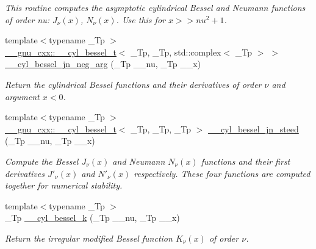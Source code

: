 \begin{DoxyCompactItemize}
\begin{DoxyCompactList}\small\item\em This routine computes the asymptotic cylindrical Bessel and Neumann functions of order nu\+: $ J_{\nu}(x) $, $ N_{\nu}(x) $. Use this for $ x >> nu^2 + 1 $. \end{DoxyCompactList}\item 
{\footnotesize template$<$typename \+\_\+\+Tp $>$ }\\\hyperlink{struct____gnu__cxx_1_1____cyl__bessel__t}{\+\_\+\+\_\+gnu\+\_\+cxx\+::\+\_\+\+\_\+cyl\+\_\+bessel\+\_\+t}$<$ \+\_\+\+Tp, \+\_\+\+Tp, std\+::complex$<$ \+\_\+\+Tp $>$ $>$ \hyperlink{namespacestd_1_1____detail_a82d890270a5a8697d4af64c390b4b0e4}{\+\_\+\+\_\+cyl\+\_\+bessel\+\_\+jn\+\_\+neg\+\_\+arg} (\+\_\+\+Tp \+\_\+\+\_\+nu, \+\_\+\+Tp \+\_\+\+\_\+x)
\begin{DoxyCompactList}\small\item\em Return the cylindrical Bessel functions and their derivatives of order $ \nu $ and argument $ x < 0 $. \end{DoxyCompactList}\item 
{\footnotesize template$<$typename \+\_\+\+Tp $>$ }\\\hyperlink{struct____gnu__cxx_1_1____cyl__bessel__t}{\+\_\+\+\_\+gnu\+\_\+cxx\+::\+\_\+\+\_\+cyl\+\_\+bessel\+\_\+t}$<$ \+\_\+\+Tp, \+\_\+\+Tp, \+\_\+\+Tp $>$ \hyperlink{namespacestd_1_1____detail_a92e231f659735cf87c67a35f5ac4dd36}{\+\_\+\+\_\+cyl\+\_\+bessel\+\_\+jn\+\_\+steed} (\+\_\+\+Tp \+\_\+\+\_\+nu, \+\_\+\+Tp \+\_\+\+\_\+x)
\begin{DoxyCompactList}\small\item\em Compute the Bessel $ J_\nu(x) $ and Neumann $ N_\nu(x) $ functions and their first derivatives $ J'_\nu(x) $ and $ N'_\nu(x) $ respectively. These four functions are computed together for numerical stability. \end{DoxyCompactList}\item 
{\footnotesize template$<$typename \+\_\+\+Tp $>$ }\\\+\_\+\+Tp \hyperlink{namespacestd_1_1____detail_ac9152f2369a18aa795fe24ccfa6dcf12}{\+\_\+\+\_\+cyl\+\_\+bessel\+\_\+k} (\+\_\+\+Tp \+\_\+\+\_\+nu, \+\_\+\+Tp \+\_\+\+\_\+x)
\begin{DoxyCompactList}\small\item\em Return the irregular modified Bessel function $ K_{\nu}(x) $ of order $ \nu $. \end{DoxyCompactList}\item 

\end{DoxyCompactItemize}
